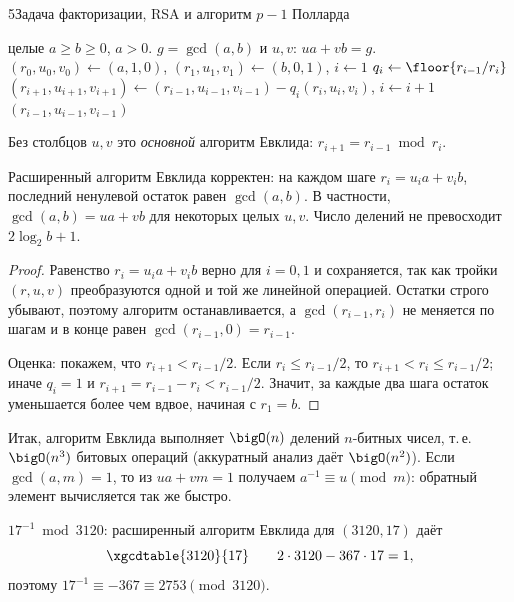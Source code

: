 \begin{lecture}{5}{Задача факторизации, RSA и алгоритм \texorpdfstring{$p - 1$}{p - 1} Полларда}
\begin{algorithm}\label{l5:xgcd}
\begin{algorithmic}[1]
\Require целые $a \ge b \ge 0$, $a > 0$.
\Ensure $g = \gcd(a, b)$ и $u, v$: $ua + vb = g$.
\State $(r_0, u_0, v_0) \gets (a, 1, 0)$, \quad $(r_1, u_1, v_1) \gets (b, 0, 1)$, \quad $i \gets 1$
  \State $q_i \gets \floor{r_{i-1} / r_i}$
  \State $(r_{i+1}, u_{i+1}, v_{i+1}) \gets (r_{i-1}, u_{i-1}, v_{i-1}) - q_i (r_i, u_i, v_i)$,
    \quad $i \gets i + 1$
\EndWhile
\State \Return $(r_{i-1}, u_{i-1}, v_{i-1})$
\end{algorithmic}
\end{algorithm}

Без столбцов $u, v$ это \emph{основной} алгоритм Евклида: $r_{i+1} = r_{i-1} \bmod r_i$.

\begin{theorem}\label{l5:bezout}
Расширенный алгоритм Евклида корректен: на каждом шаге $r_i = u_i a + v_i b$, последний ненулевой
остаток равен $\gcd(a, b)$. В частности, $\gcd(a, b) = ua + vb$ для некоторых целых $u, v$.
Число делений не превосходит $2\log_2 b + 1$.
\end{theorem}

\begin{proof}
Равенство $r_i = u_i a + v_i b$ верно для $i = 0, 1$ и сохраняется, так как тройки
$(r, u, v)$ преобразуются одной и той же линейной операцией. Остатки строго убывают, поэтому
алгоритм останавливается, а $\gcd(r_{i-1}, r_i)$ не меняется по шагам и в конце равен
$\gcd(r_{i-1}, 0) = r_{i-1}$.

Оценка: покажем, что $r_{i+1} < r_{i-1} / 2$. Если $r_i \le r_{i-1}/2$, то
$r_{i+1} < r_i \le r_{i-1}/2$; иначе $q_i = 1$ и $r_{i+1} = r_{i-1} - r_i < r_{i-1}/2$. Значит,
за каждые два шага остаток уменьшается более чем вдвое, начиная с $r_1 = b$.
\end{proof}

Итак, алгоритм Евклида выполняет $\bigO(n)$ делений $n$-битных чисел, т.\,е. $\bigO(n^3)$
битовых операций (аккуратный анализ даёт $\bigO(n^2)$). Если $\gcd(a, m) = 1$, то из
$ua + vm = 1$ получаем $a^{-1} \equiv u \pmod m$: обратный элемент вычисляется так же быстро.

\begin{example}\label{l5:xgcd-example}
$17^{-1} \bmod 3120$: расширенный алгоритм Евклида для $(3120, 17)$ даёт
\[
  \xgcdtable{3120}{17}
  \qquad 2 \cdot 3120 - 367 \cdot 17 = 1,
\]
поэтому $17^{-1} \equiv -367 \equiv 2753 \pmod{3120}$.
\end{example}


\end{lecture}
